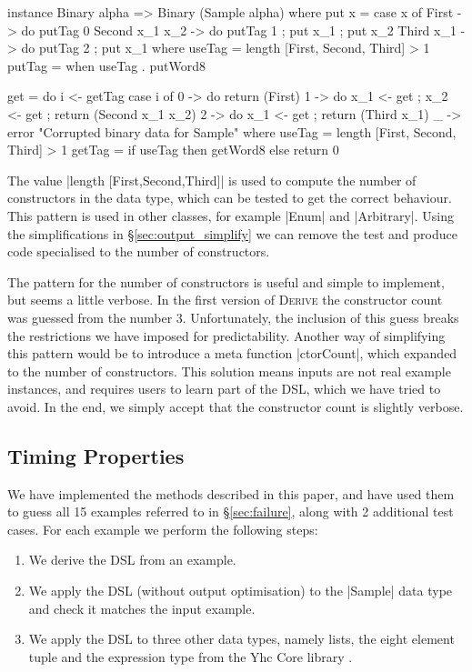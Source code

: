 \documentclass[preprint,draft]{sigplanconf}
\newcommand{\derive}{\textsc{Derive}}
\begin{document}
\begin{code}
instance Binary alpha => Binary (Sample alpha) where
    put x = case x of
        First            -> do putTag 0
        Second  x_1 x_2  -> do putTag 1 ; put x_1 ; put x_2
        Third   x_1      -> do putTag 2 ; put x_1
        where
            useTag = length [First{}, Second{}, Third{}] > 1
            putTag = when useTag . putWord8

    get = do
        i <- getTag
        case i of
            0 -> do return (First)
            1 -> do x_1 <- get ; x_2 <- get ; return (Second x_1 x_2)
            2 -> do x_1 <- get ; return (Third x_1)
            _ -> error "Corrupted binary data for Sample"
        where
            useTag = length [First{}, Second{}, Third{}] > 1
            getTag = if useTag then getWord8 else return 0
\end{code}

The value |length [First{},Second{},Third{}]| is used to compute the number of constructors in the data type, which can be tested to get the correct behaviour. This pattern is used in other classes, for example |Enum| and |Arbitrary|. Using the simplifications in \S\ref{sec:output_simplify} we can remove the test and produce code specialised to the number of constructors.

The pattern for the number of constructors is useful and simple to implement, but seems a little verbose. In the first version of \derive{} the constructor count was guessed from the number 3. Unfortunately, the inclusion of this guess breaks the restrictions we have imposed for predictability. Another way of simplifying this pattern would be to introduce a meta function |ctorCount|, which expanded to the number of constructors. This solution means inputs are not real example instances, and requires users to learn part of the DSL, which we have tried to avoid. In the end, we simply accept that the constructor count is slightly verbose.

\subsection{Timing Properties}

We have implemented the methods described in this paper, and have used them to guess all 15 examples referred to in \S\ref{sec:failure}, along with 2 additional test cases. For each example we perform the following steps:

\begin{enumerate}
\item We derive the DSL from an example.
\item We apply the DSL (without output optimisation) to the |Sample| data type and check it matches the input example.
\item We apply the DSL to three other data types, namely lists, the eight element tuple and the expression type from the Yhc Core library \cite{me:yhc_core}.
\end{enumerate}
\end{document}
